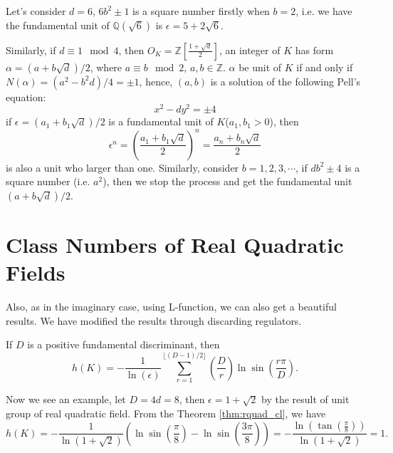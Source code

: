 Let's consider $d=6$, $6b^2\pm1$ is a square number firstly when $b=2$, i.e. we have the fundamental unit of $\mathbb{Q}(\sqrt{6})$ is $\epsilon=5+2\sqrt{6}$.

Similarly, if $d\equiv1 \mod 4$, then $O_K=\mathbb{Z}[\frac{1+\sqrt{d}}{2}]$, an integer of $K$ has form $\alpha=(a+b\sqrt{d})/2$, where $a\equiv b \mod 2$, $a,b\in\mathbb{Z}$. $\alpha$ be unit of $K$ if and only if $N(\alpha)=(a^2-b^2d)/4=\pm1$, hence, $(a,b)$ is a solution of the following Pell's equation:
\begin{equation}\label{eqn:pell2}
x^2-d y^2=\pm4
\end{equation}
if $\epsilon=(a_1+b_1\sqrt{d})/2$ is a fundamental unit of $K$($a_1,b_1>0$), then $$\epsilon^n=(\frac{a_1+b_1\sqrt{d}}{2})^n=\frac{a_n+b_n\sqrt{d}}{2}$$ is also a unit who larger than one. Similarly, consider $b=1,2,3,\cdots$, if $d b^2\pm4$ is a square number (i.e. $a^2$), then we stop the process and get the fundamental unit $(a+b\sqrt{d})/2$.

\section{Class Numbers of Real Quadratic Fields}
Also, as in the imaginary case, using L-function, we can also get a beautiful results\citep{cohen1993course}. We have modified the results through discarding regulators.

\begin{theorem}\label{thm:rquad_cl}
If $D$ is a positive fundamental discriminant, then $$h(K)=-\frac{1}{\operatorname{ln}(\epsilon)}\sum_{r=1}^{\lfloor(D-1)/2\rfloor}\left(\frac{D}{r}\right)\operatorname{ln}\sin\left(\frac{r\pi}{D}\right).$$
\end{theorem}

Now we see an example, let $D=4d=8$, then $\epsilon=1+\sqrt{2}$ by the result of unit group of real quadratic field. From the Theorem \ref{thm:rquad_cl}, we have $$h(K)=-\frac{1}{\operatorname{ln}(1+\sqrt{2})}\left(\operatorname{ln}\sin(\frac{\pi}{8})-\operatorname{ln}\sin(\frac{3\pi}{8})\right)=-\frac{\operatorname{ln}(\tan(\frac{\pi}{8}))}{\operatorname{ln}(1+\sqrt{2})}=1.$$


